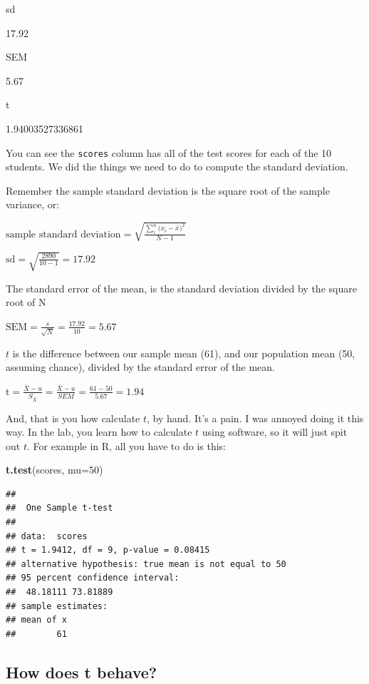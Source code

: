 \documentclass[]{book}
\newenvironment{Shaded}{\begin{snugshade}}{\end{snugshade}}
\newcommand{\DataTypeTok}[1]{\textcolor[rgb]{0.13,0.29,0.53}{#1}}
\newcommand{\DecValTok}[1]{\textcolor[rgb]{0.00,0.00,0.81}{#1}}
\newcommand{\KeywordTok}[1]{\textcolor[rgb]{0.13,0.29,0.53}{\textbf{#1}}}
\newcommand{\NormalTok}[1]{#1}
\begin{document}
sd

17.92

SEM

5.67

t

1.94003527336861

You can see the \texttt{scores} column has all of the test scores for each of the 10 students. We did the things we need to do to compute the standard deviation.

Remember the sample standard deviation is the square root of the sample variance, or:

\(\text{sample standard deviation} = \sqrt{\frac{\sum_{i}^{n}({x_{i}-\bar{x})^2}}{N-1}}\)

\(\text{sd} = \sqrt{\frac{2890}{10-1}} = 17.92\)

The standard error of the mean, is the standard deviation divided by the square root of N

\(\text{SEM} = \frac{s}{\sqrt{N}} = \frac{17.92}{10} = 5.67\)

\(t\) is the difference between our sample mean (61), and our population mean (50, assuming chance), divided by the standard error of the mean.

\(\text{t} = \frac{\bar{X}-u}{S_{\bar{X}}} = \frac{\bar{X}-u}{SEM} = \frac{61-50}{5.67} = 1.94\)

And, that is you how calculate \(t\), by hand. It's a pain. I was annoyed doing it this way. In the lab, you learn how to calculate \(t\) using software, so it will just spit out \(t\). For example in R, all you have to do is this:

\begin{Shaded}
\begin{Highlighting}[]
\KeywordTok{t.test}\NormalTok{(scores, }\DataTypeTok{mu=}\DecValTok{50}\NormalTok{)}
\end{Highlighting}
\end{Shaded}

\begin{verbatim}
## 
## 	One Sample t-test
## 
## data:  scores
## t = 1.9412, df = 9, p-value = 0.08415
## alternative hypothesis: true mean is not equal to 50
## 95 percent confidence interval:
##  48.18111 73.81889
## sample estimates:
## mean of x 
##        61
\end{verbatim}

\hypertarget{how-does-t-behave}{%
\subsection{How does t behave?}\label{how-does-t-behave}}
\end{document}
